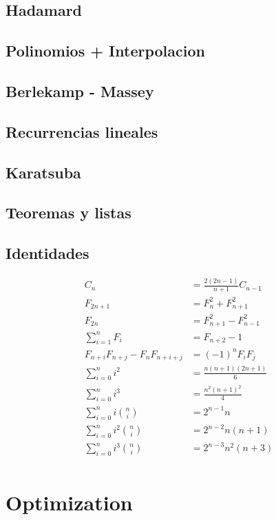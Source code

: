 \subsection{Hadamard}
\subsection{Polinomios + Interpolacion}
\subsection{Berlekamp - Massey}
\subsection{Recurrencias lineales}
\subsection{Karatsuba}
\subsection{Teoremas y listas}
\subsection{Identidades}
\begin{align*}
	C_n &= \frac{2(2n-1)}{n+1} C_{n-1} \\
	F_{2n+1} &= F_{n}^2 + F_{n+1}^2 \\
	F_{2n} &= F_{n+1}^2 - F_{n-1}^2 \\
	\sum_{i=1}^n F_i &= F_{n+2}-1 \\
	F_{n+i}F_{n+j} - F_nF_{n+i+j} &= (-1)^n F_iF_j \\
	\sum_{i=0}^n i^2 &= \frac{n(n+1)(2n+1)}{6} \\
	\sum_{i=0}^n i^3 &= \frac{n^2(n+1)^2}{4} \\
	\sum_{i=0}^n i \binom n i &= 2^{n - 1}n \\
	\sum_{i=0}^n i^2 \binom n i &= 2^{n - 2}n(n+1) \\
	\sum_{i=0}^n i^3 \binom n i &= 2^{n - 3}n^2(n+3) \\
\end{align*}

\section{Optimization}
